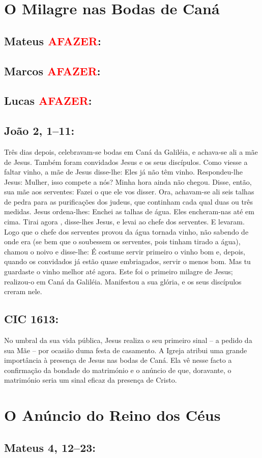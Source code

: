\documentclass[10pt,a5paper]{book}
\newcommand{\from}[1]{\subsection*{#1}}
\newcommand{\TODO}{\textcolor{red}{\ttfamily AFAZER}}
\begin{document}

\section{O Milagre nas Bodas de Caná}

\from{Mateus \TODO:}

\from{Marcos \TODO:}

\from{Lucas \TODO:}

\from{João 2, 1--11:}

Três dias depois, celebravam-se bodas em Caná da Galiléia, e achava-se ali a mãe de Jesus.
Também foram convidados Jesus e os seus discípulos.
Como viesse a faltar vinho, a mãe de Jesus disse-lhe:
Eles já não têm vinho.
Respondeu-lhe Jesus:
Mulher, isso compete a nós? Minha hora ainda não chegou.
Disse, então, sua mãe aos serventes:
Fazei o que ele vos disser.
Ora, achavam-se ali seis talhas de pedra para as purificações dos judeus, que continham cada qual duas ou três medidas.
Jesus ordena-lhes:
Enchei as talhas de água.
Eles encheram-nas até em cima.
Tirai agora , disse-lhes Jesus, e levai ao chefe dos serventes.
E levaram.
Logo que o chefe dos serventes provou da água tornada vinho, não sabendo de onde era (se bem que o soubessem os serventes, pois tinham tirado a água), chamou o noivo
e disse-lhe:
É costume servir primeiro o vinho bom e, depois, quando os convidados já estão quase embriagados, servir o menos bom.
Mas tu guardaste o vinho melhor até agora.
Este foi o primeiro milagre de Jesus;
realizou-o em Caná da Galiléia.
Manifestou a sua glória, e os seus discípulos creram nele.

\from{CIC 1613:}

No umbral da sua vida pública, Jesus realiza o seu primeiro sinal -- a pedido da sua Mãe -- por ocasião duma festa de casamento.
A Igreja atribui uma grande importância à presença de Jesus nas bodas de Caná.
Ela vê nesse facto a confirmação da bondade do matrimónio e o anúncio de que, doravante, o matrimónio seria um sinal eficaz da presença de Cristo.


\section{O Anúncio do Reino dos Céus}

\from{Mateus 4, 12--23:}
\end{document}
